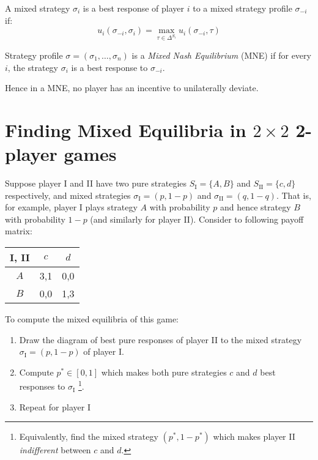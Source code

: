 	\begin{definition}
		A mixed strategy $\sigma_i$ is a best response of player $i$ to a mixed
		strategy profile $\sigma_{-i}$ if:
		\begin{equation}
			u_i(\sigma_{-i}, \sigma_i) = \max_{\tau \in \Delta^{S_i}} u_i(\sigma_{-i}, \tau)
		\end{equation}
	\end{definition}

	\begin{definition}
		\label{def:BR}
		Strategy profile $\sigma = (\sigma_1, \ldots, \sigma_n)$ is a
		\textit{Mixed Nash Equilibrium} (MNE) if for every $i$, the strategy
		$\sigma_i$ is a best response to $\sigma_{-i}$.
	\end{definition}

	Hence in a MNE, no player has an incentive to unilaterally deviate.

\section{Finding Mixed Equilibria in $2\times2$ 2-player games}
	Suppose player I and II have two pure strategies $S_\text{I} = \{A, B\}$
	and $S_\text{II} = \{c, d\}$ respectively, and mixed strategies
	$\sigma_{\text{I}} = (p, 1-p)$ and $\sigma_{\text{II}} = (q, 1-q)$. That
	is, for example, player I plays strategy $A$ with probability $p$ and hence
	strategy $B$ with probability $1-p$ (and similarly for player II).
	Consider to following payoff matrix:
	\begin{center}
		\begin{tabular}{|c|c|c|}
			\hline
			I, II & $c$ & $d$ \\ \hline
			$A$ & 3,1 & 0,0 \\ \hline
			$B$ & 0,0 & 1,3 \\ \hline
		\end{tabular}
	\end{center}

	To compute the mixed equilibria of this game:
	\begin{enumerate}
		\itemsep0em
		\item Draw the diagram of best pure responses of player II to the mixed
			strategy $\sigma_{\text{I}} = (p, 1-p)$ of player I.
		\item Compute $p^* \in [0,1]$ which makes both pure strategies $c$ and
			$d$ best responses to $\sigma_{\text{I}}$ \footnote{Equivalently,
			find the mixed strategy $(p^*, 1-p^*)$ which makes player II
			\textit{indifferent} between $c$ and $d$.}.
		\item Repeat for player I
	\end{enumerate}

